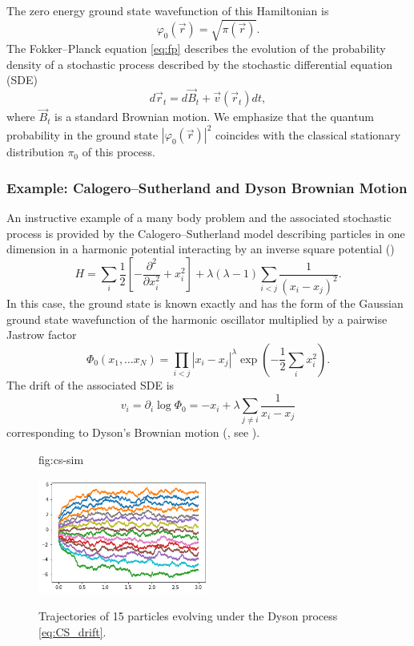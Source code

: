 \documentclass[12pt]{msml2020} %
\begin{document}
%
The zero energy ground state wavefunction of this Hamiltonian is
%
\begin{equation}
  \varphi_0({\vec{r}}) = \sqrt{\pi({\vec{r}})}.
\end{equation}
%
The Fokker--Planck equation \eqref{eq:fp} describes the evolution of the probability density of a stochastic process described by the stochastic differential equation (SDE)
%
\begin{equation}\label{eq:SDE2}
  d{\vec{r}}_t = d\vec{B}_t +\vec{v}({{\vec{r}}_t})dt,
\end{equation}
%
where $\vec{B}_t$ is a standard Brownian motion. 
We emphasize that the quantum probability in the ground state $|\varphi_{0}({\vec{r}})|^2$ coincides with the classical stationary distribution $\pi_0$ of this process. 

\subsubsection{Example: Calogero--Sutherland and Dyson Brownian Motion}

An instructive example of a many body problem and the associated stochastic process is provided by the Calogero--Sutherland model describing particles in one dimension in a harmonic potential interacting by an inverse square potential (\cite{Sutherland:1972aa})
%
$$
H = \sum_i \frac{1}{2}\left[-\frac{\partial^2}{\partial x_i^2}+x_i^2\right] + \lambda(\lambda-1)\sum_{i<j} \frac{1}{(x_i-x_j)^2}.
$$
%
In this case, the ground state is known exactly and has the form of the Gaussian ground state wavefunction of the harmonic oscillator multiplied by a pairwise Jastrow factor
%
$$
\Phi_0(x_1,\ldots x_N) = \prod_{i<j}|x_i-x_j|^{\lambda}\exp\left(-\frac{1}{2}\sum_i x_i^2\right).
$$
%
The drift of the associated SDE is
%
\begin{equation}\label{eq:CS_drift}
v_i =\partial_i \log\Phi_0= - x_i + \lambda \sum_{j\neq i} \frac{1}{x_i-x_j}
\end{equation}
%
corresponding to Dyson's Brownian motion (\cite{Dyson:1962aa}, see ).

\begin{figure}
\floatconts
  {fig:cs-sim}%
  {\caption{Trajectories of 15 particles evolving under the Dyson process \eqref{eq:CS_drift}.}}%
  {\includegraphics[width=0.5\textwidth]{15_particles.png}}
\end{figure}
\end{document}
